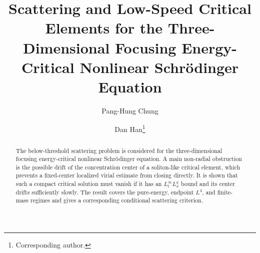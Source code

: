 \documentclass[smallextended,envcountsect,nospthms]{svjour3}
\numberwithin{equation}{section}
\theoremstyle{spbreak}
\theoremstyle{spdefbreak}
\theoremstyle{spdefbreak}
\begin{document}
\title{Scattering and Low-Speed Critical Elements for the Three-Dimensional Focusing Energy-Critical Nonlinear Schr\"odinger Equation}

\author{Pang-Hung Chung \and Dan Han\thanks{Corresponding author.}}


\date{}

\maketitle


\begin{abstract}
The below-threshold scattering problem is considered for the three-dimensional focusing energy-critical nonlinear Schr\"odinger equation. A main non-radial obstruction is the possible drift of the concentration center of a soliton-like critical element, which prevents a fixed-center localized virial estimate from closing directly. It is shown that such a compact critical solution must vanish if it has an $L_t^\infty L_x^q$ bound and its center drifts sufficiently slowly. The result covers the pure-energy, endpoint $L^4$, and finite-mass regimes and gives a corresponding conditional scattering criterion.
\end{abstract}

\medskip
\end{document}

